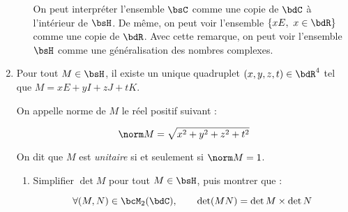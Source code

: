 \documentclass[a4paper,french,bookmarks]{article}
\begin{document}
\begin{enumerate}
\begin{enumerate}
        
        On peut interpréter l'ensemble $\bsC$ comme une copie de $\bdC$ à l'intérieur de $\bsH$. De même, on peut voir l'ensemble $\{xE,\ x \in \bdR\}$ comme une copie de $\bdR$. Avec cette remarque, on peut voir l'ensemble $\bsH$ comme une généralisation des nombres complexes.
    \end{enumerate}
    
    \item Pour tout $M \in \bsH$, il existe un unique quadruplet $(x, y, z, t) \in \bdR^4$ tel que $M = xE + yI + zJ + tK$.
    
    On appelle norme de $M$ le réel positif suivant :
    
    \begin{equation}
        \norm M = \sqrt{x^2 + y^2 + z^2 + t^2}
    \end{equation}
    
    On dit que $M$ est \textit{\color{main1}unitaire} si et seulement si $\norm M = 1$.
    
    \begin{enumerate}
        \item Simplifier $\det M$ pour tout $M \in \bsH$, puis montrer que :
        
        \begin{equation}
            \forall (M, N) \in \bcM_2(\bdC),\qquad \det (MN) = \det M \times \det N
        \end{equation}
        

\end{enumerate}
\end{enumerate}
\end{document}
